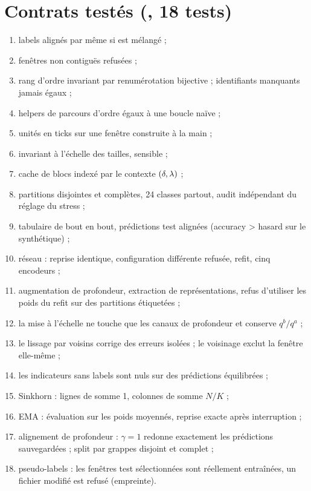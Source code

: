 \section{Contrats testés (, 18 tests)}
\begin{enumerate}
\item labels alignés par  même si  est mélangé ;
\item fenêtres non contiguës refusées ;
\item rang d'ordre invariant par renumérotation bijective ; identifiants manquants jamais égaux ;
\item helpers de parcours d'ordre égaux à une boucle naïve ;
\item unités en ticks sur une fenêtre construite à la main ;
\item {} invariant à l'échelle des tailles,  sensible ;
\item cache de blocs indexé par le contexte $(\delta,\lambda)$ ;
\item partitions disjointes et complètes, 24 classes partout, audit indépendant du réglage du stress ;
\item tabulaire de bout en bout, prédictions test alignées (accuracy > hasard sur le synthétique) ;
\item réseau : reprise identique, configuration différente refusée, refit, cinq encodeurs ;
\item augmentation de profondeur, extraction de représentations, refus d'utiliser les poids du refit sur des partitions étiquetées ;
\item la mise à l'échelle ne touche que les canaux de profondeur et conserve $q^b/q^a$ ;
\item le lissage par voisins corrige des erreurs isolées ; le voisinage exclut la fenêtre elle-même ;
\item les indicateurs sans labels sont nuls sur des prédictions équilibrées ;
\item Sinkhorn : lignes de somme 1, colonnes de somme $N/K$ ;
\item EMA : évaluation sur les poids moyennés, reprise exacte après interruption ;
\item alignement de profondeur : $\gamma=1$ redonne exactement les prédictions sauvegardées ; split par grappes disjoint et complet ;
\item pseudo-labels : les fenêtres test sélectionnées sont réellement entraînées, un fichier modifié est refusé (empreinte).
\end{enumerate}

